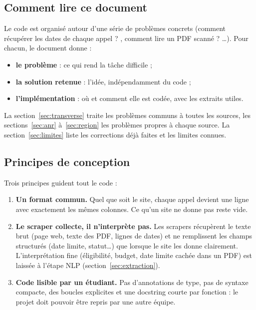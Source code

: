 \documentclass[11pt,a4paper]{article}
\begin{document}
\subsection{Comment lire ce document}

Le code est organisé autour d'une série de problèmes concrets (\og comment récupérer
les dates de chaque appel ? \fg, \og comment lire un PDF scanné ? \fg\dots). Pour chacun,
le document donne :

\begin{itemize}
  \item \textbf{\textcolor{pbcolor}{le problème}} : ce qui rend la tâche difficile ;
  \item \textbf{\textcolor{solcolor}{la solution retenue}} : l'idée, indépendamment du code ;
  \item \textbf{\textcolor{implcolor}{l'implémentation}} : où et comment elle est codée,
        avec les extraits utiles.
\end{itemize}

La section~\ref{sec:transverse} traite les problèmes communs à toutes les sources, les
sections~\ref{sec:anr} à~\ref{sec:region} les problèmes propres à chaque source.
La section~\ref{sec:limites} liste les corrections déjà faites et les limites connues.

\subsection{Principes de conception}

Trois principes guident tout le code :

\begin{enumerate}
  \item \textbf{Un format commun.} Quel que soit le site, chaque appel devient une ligne
        avec exactement les mêmes colonnes. Ce qu'un site ne donne pas reste vide.
  \item \textbf{Le scraper collecte, il n'interprète pas.} Les scrapers récupèrent
        le texte brut (page web, texte des PDF, lignes de dates) et ne remplissent les champs
        structurés (date limite, statut\dots) que lorsque le site les donne clairement.
        L'interprétation fine (éligibilité, budget, date limite cachée dans un PDF) est
        laissée à l'étape NLP (section~\ref{sec:extraction}).
  \item \textbf{Code lisible par un étudiant.} Pas d'annotations de type, pas de syntaxe
        compacte, des boucles explicites et une docstring courte par fonction : le projet doit
        pouvoir être repris par une autre équipe.
\end{enumerate}
\end{document}
